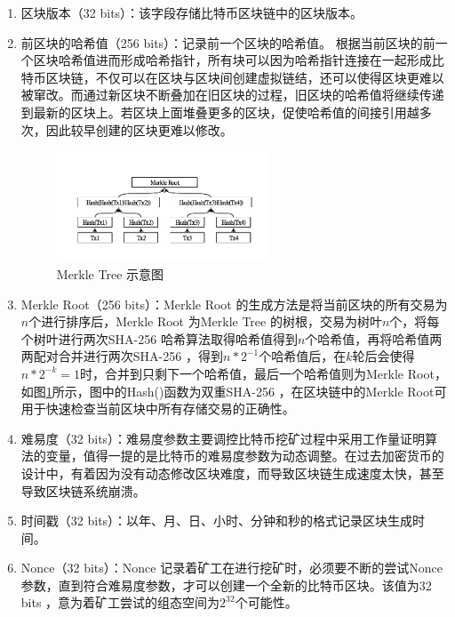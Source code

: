 				\begin{enumerate}
				\item 区块版本（32 bits）：该字段存储比特币区块链中的区块版本。
				\item 前区块的哈希值（256 bits）：记录前一个区块的哈希值。 根据当前区块的前一个区块哈希值进而形成哈希指针，所有块可以因为哈希指针连接在一起形成比特币区块链，不仅可以在区块与区块间创建虚拟链结，还可以使得区块更难以被窜改。而通过新区块不断叠加在旧区块的过程，旧区块的哈希值将继续传递到最新的区块上。若区块上面堆叠更多的区块，促使哈希值的间接引⽤越多次，因此较早创建的区块更难以修改。

				\begin{figure}[!htb]
					\centering
					\includegraphics[width = 0.6\textwidth]{MerkleRoot.pdf}
					\caption{Merkle Tree 示意图}\label{MerkleRoot}
				\end{figure}

				\item Merkle Root（256 bits）：Merkle Root 的生成方法是将当前区块的所有交易为$n$个进行排序后，Merkle Root 为Merkle Tree 的树根，交易为树叶$n$个，将每个树叶进行两次SHA-256 哈希算法取得哈希值得到$n$个哈希值，再将哈希值两两配对合并进行两次SHA-256 ，得到$n*2^{-1}$个哈希值后，在$k$轮后会使得$n*2^{-k}=1$时，合并到只剩下一个哈希值，最后一个哈希值则为Merkle Root，如图\ref{MerkleRoot}所示，图中的Hash()函数为双重SHA-256 ，在区块链中的Merkle Root可用于快速检查当前区块中所有存储交易的正确性。

				

				\item 难易度（32 bits）：难易度参数主要调控比特币挖矿过程中采用工作量证明算法的变量，值得一提的是比特币的难易度参数为动态调整。在过去加密货币的设计中，有着因为没有动态修改区块难度，而导致区块链生成速度太快，甚至导致区块链系统崩溃。
				\item 时间戳（32 bits）：以年、月、日、小时、分钟和秒的格式记录区块生成时间。
				\item Nonce（32 bits）：Nonce 记录着矿工在进行挖矿时，必须要不断的尝试Nonce 参数，直到符合难易度参数，才可以创建一个全新的比特币区块。该值为32 bits ，意为着矿工尝试的组态空间为$2^{32}$个可能性。
				\end{enumerate}
				
